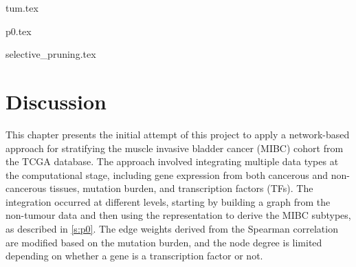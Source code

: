 {tum.tex}



{p0.tex}


{selective_pruning.tex}

\newpage

\section{Discussion}

This chapter presents the initial attempt of this project to apply a network-based approach for stratifying the muscle invasive bladder cancer (MIBC) cohort from the TCGA database. The approach involved integrating multiple data types at the computational stage, including gene expression from both cancerous and non-cancerous tissues, mutation burden, and transcription factors (TFs). The integration occurred at different levels, starting by building a graph from the non-tumour data and then using the representation to derive the MIBC subtypes, as described in \cref{s:p0}. The edge weights derived from the Spearman correlation are modified based on the mutation burden, and the node degree is limited depending on whether a gene is a transcription factor or not.


